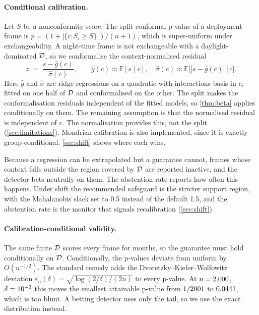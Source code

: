 \paragraph{Conditional calibration.}
Let $S$ be a nonconformity score. The split-conformal p-value of a deployment frame is $p = (1 + |\{i : S_i \ge S\}|)/(n+1)$, which is super-uniform under exchangeability. A night-time frame is not exchangeable with a daylight-dominated $\mathcal{D}$, so we conformalise the context-normalised residual
\begin{equation}
\label{eq:residual}
  z \;=\; \frac{s - \hat g(c)}{\hat\sigma(c)},
  \qquad
  \hat g(c) \approx \mathbb{E}[s \mid c],
  \quad
  \hat\sigma(c) \approx \mathbb{E}\bigl[|s - \hat g(c)| \,\big|\, c\bigr].
\end{equation}
Here $\hat g$ and $\hat\sigma$ are ridge regressions on a quadratic-with-interactions basis in $c$, fitted on one half of $\mathcal{D}$ and conformalised on the other. The split makes the conformalisation residuals independent of the fitted models, so \cref{thm:beta} applies conditionally on them. The remaining assumption is that the normalised residual is independent of $c$. The normalisation provides this, not the split (\cref{sec:limitations}). Mondrian calibration is also implemented, since it is exactly group-conditional. \cref{sec:shift} shows where each wins.

Because a regression can be extrapolated but a guarantee cannot, frames whose context falls outside the region covered by $\mathcal{D}$ are reported inactive, and the detector bets neutrally on them. The abstention rate reports how often this happens. Under shift the recommended safeguard is the stricter support region, with the Mahalanobis slack set to 0.5 instead of the default 1.5, and the abstention rate is the monitor that signals recalibration (\cref{sec:shift}).

\paragraph{Calibration-conditional validity.}
The same finite $\mathcal{D}$ scores every frame for months, so the guarantee must hold conditionally on $\mathcal{D}$. Conditionally, the p-values deviate from uniform by $O(n^{-1/2})$. The standard remedy adds the Dvoretzky--Kiefer--Wolfowitz deviation $\varepsilon_n(\delta) = \sqrt{\log(2/\delta)/(2n)}$ \citep{dkw1956,massart1990} to every p-value. At $n=2{,}000{}$, $\delta=10^{-3}{}$ this moves the smallest attainable p-value from $1/2001{}$ to $0.0441{}$, which is too blunt. A betting detector uses only the tail, so we use the exact distribution instead.

